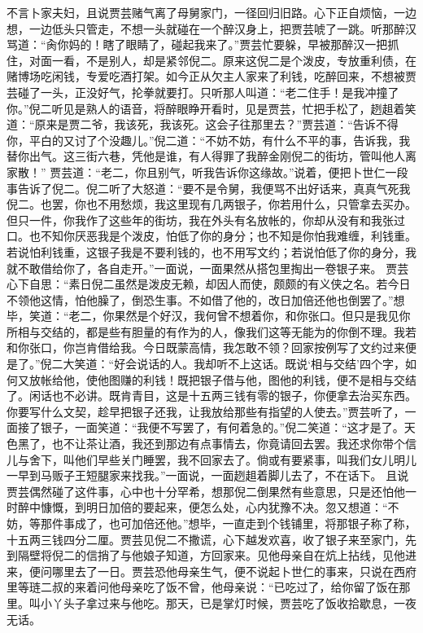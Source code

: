 \documentclass[12pt,oneside]{book}
\begin{document}
不言卜家夫妇，且说贾芸赌气离了母舅家门，一径回归旧路。心下正自烦恼，一边想，一边低头只管走，不想一头就碰在一个醉汉身上，把贾芸唬了一跳。听那醉汉骂道：“肏你妈的！瞎了眼睛了，碰起我来了。”贾芸忙要躲，早被那醉汉一把抓住，对面一看，不是别人，却是紧邻倪二。原来这倪二是个泼皮，专放重利债，在赌博场吃闲钱，专爱吃酒打架。如今正从欠主人家来了利钱，吃醉回来，不想被贾芸碰了一头，正没好气，抡拳就要打。只听那人叫道：“老二住手！是我冲撞了你。”倪二听见是熟人的语音，将醉眼睁开看时，见是贾芸，忙把手松了，趔趄着笑道：“原来是贾二爷，我该死，我该死。这会子往那里去？”贾芸道：“告诉不得你，平白的又讨了个没趣儿。”倪二道：“不妨不妨，有什么不平的事，告诉我，我替你出气。这三街六巷，凭他是谁，有人得罪了我醉金刚倪二的街坊，管叫他人离家散！”
贾芸道：“老二，你且别气，听我告诉你这缘故。”说着，便把卜世仁一段事告诉了倪二。倪二听了大怒道：“要不是令舅，我便骂不出好话来，真真气死我倪二。也罢，你也不用愁烦，我这里现有几两银子，你若用什么，只管拿去买办。但只一件，你我作了这些年的街坊，我在外头有名放帐的，你却从没有和我张过口。也不知你厌恶我是个泼皮，怕低了你的身分；也不知是你怕我难缠，利钱重。若说怕利钱重，这银子我是不要利钱的，也不用写文约；若说怕低了你的身分，我就不敢借给你了，各自走开。”一面说，一面果然从搭包里掏出一卷银子来。
贾芸心下自思：“素日倪二虽然是泼皮无赖，却因人而使，颇颇的有义侠之名。若今日不领他这情，怕他臊了，倒恐生事。不如借了他的，改日加倍还他也倒罢了。”想毕，笑道：“老二，你果然是个好汉，我何曾不想着你，和你张口。但只是我见你所相与交结的，都是些有胆量的有作为的人，像我们这等无能为的你倒不理。我若和你张口，你岂肯借给我。今日既蒙高情，我怎敢不领？回家按例写了文约过来便是了。”倪二大笑道：“好会说话的人。我却听不上这话。既说‘相与交结’四个字，如何又放帐给他，使他图赚的利钱！既把银子借与他，图他的利钱，便不是相与交结了。闲话也不必讲。既肯青目，这是十五两三钱有零的银子，你便拿去治买东西。你要写什么文契，趁早把银子还我，让我放给那些有指望的人使去。”贾芸听了，一面接了银子，一面笑道：“我便不写罢了，有何着急的。”倪二笑道：“这才是了。天色黑了，也不让茶让酒，我还到那边有点事情去，你竟请回去罢。我还求你带个信儿与舍下，叫他们早些关门睡罢，我不回家去了。倘或有要紧事，叫我们女儿明儿一早到马贩子王短腿家来找我。”一面说，一面趔趄着脚儿去了，不在话下。
且说贾芸偶然碰了这件事，心中也十分罕希，想那倪二倒果然有些意思，只是还怕他一时醉中慷慨，到明日加倍的要起来，便怎么处，心内犹豫不决。忽又想道：“不妨，等那件事成了，也可加倍还他。”想毕，一直走到个钱铺里，将那银子称了称，十五两三钱四分二厘。贾芸见倪二不撒谎，心下越发欢喜，收了银子来至家门，先到隔壁将倪二的信捎了与他娘子知道，方回家来。见他母亲自在炕上拈线，见他进来，便问哪里去了一日。贾芸恐他母亲生气，便不说起卜世仁的事来，只说在西府里等琏二叔的来着问他母亲吃了饭不曾，他母亲说：“已吃过了，给你留了饭在那里。叫小丫头子拿过来与他吃。那天，已是掌灯时候，贾芸吃了饭收拾歇息，一夜无话。
\end{document}
